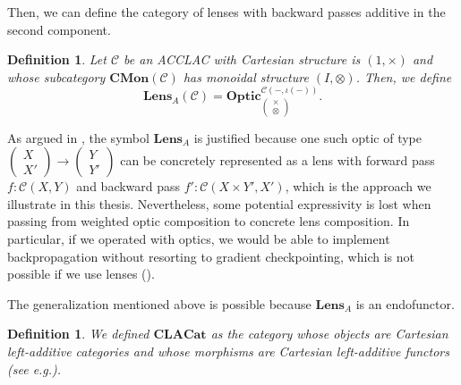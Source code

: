 \documentclass[11pt,a4paper,openright,twoside]{report}
\newcounter{mycounter}
\theoremstyle{plain}
\newtheorem{definition}[mycounter]{Definition}
\theoremstyle{definition}
\begin{document}
Then, we can define the category of lenses with backward passes additive in the second component.

\begin{definition}
  Let $\mathcal{C}$ be an ACCLAC with Cartesian structure is $(1, \times)$ and whose subcategory $\mathbf{CMon}(\mathcal{C})$ has monoidal structure $(I, \otimes)$. Then, we define
  \[\mathbf{Lens}_A(\mathcal{C}) = \mathbf{Optic}_{\left(\begin{smallmatrix}\times \\ \otimes\end{smallmatrix}\right)}^{\mathcal{C}(-,\iota(-))}.\]
\end{definition}

As argued in \cite{gavranovic2024fundamental}, the symbol $\mathbf{Lens}_A$ is justified because one such optic of type $\left(\begin{smallmatrix}X \\ X'\end{smallmatrix}\right) \to \left(\begin{smallmatrix}Y \\ Y'\end{smallmatrix}\right)$ can be concretely represented as a lens with forward pass $f : \mathcal{C}(X,Y)$ and backward pass $f' : \mathcal{C}(X \times Y',X')$, which is the approach we illustrate in this thesis.  Nevertheless, some potential expressivity is lost when passing from weighted optic composition to concrete lens composition. In particular, if we operated with optics, we would be able to implement backpropagation without resorting to gradient checkpointing, which is not possible if we use lenses (\cite{gavranovic2024fundamental}). 

The generalization mentioned above is possible because $\mathbf{Lens}_A$ is an endofunctor.

\begin{definition}
  We defined $\mathbf{CLACat}$ as the category whose objects are Cartesian left-additive categories and whose morphisms are Cartesian left-additive functors (see e.g.\cite{blute2006differential}).
\end{definition}
\end{document}
